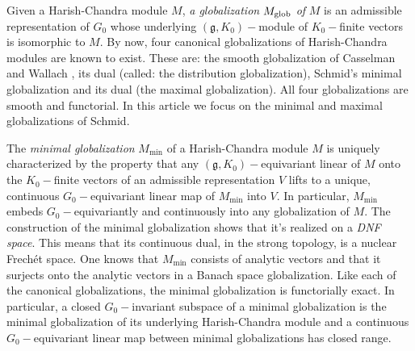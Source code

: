 \smallskip \smallskip

\noindent Given a Harish-Chandra module $M$, \emph{a globalization} $M_{%
\text{glob}}$ \emph{of }$M$ is an admissible representation of $G_{0}$ whose
underlying $(\mathfrak{g},K_{0})-$module of $K_{0}-$finite vectors is
isomorphic to $M$. By now, four canonical globalizations of Harish-Chandra
modules are known to exist. These are: the smooth globalization of Casselman
and Wallach \cite{C}, its dual (called: the distribution globalization),
Schmid's minimal globalization \cite{S} and its dual (the maximal
globalization). All four globalizations are smooth and functorial. In this
article we focus on the minimal and maximal globalizations of Schmid.

\smallskip \smallskip

\noindent The \emph{minimal globalization }$M_{\text{min}}$ of a
Harish-Chandra module $M$ is uniquely characterized by the property that any
$(\mathfrak{g},K_{0})-$equivariant linear of $M$ onto the $K_{0}-$finite
vectors of an admissible representation $V$ lifts to a unique, continuous $%
G_{0}-$equivariant linear map of $M_{\text{min}}$ into $V$. In particular, $%
M_{\text{min}}$ embeds $G_{0}-$equivariantly and continuously into any
globalization of $M$. The construction of the minimal globalization shows
that it's realized on a \emph{DNF space}. This means that its continuous
dual, in the strong topology, is a nuclear Frech\'{e}t space. One knows that
$M_{\text{min}}$ consists of analytic vectors and that it surjects onto the
analytic vectors in a Banach space globalization. Like each of the canonical
globalizations, the minimal globalization is functorially exact. In
particular, a closed $G_{0}-$invariant subspace of a minimal globalization
is the minimal globalization of its underlying Harish-Chandra module and a
continuous $G_{0}-$equivariant linear map between minimal globalizations has
closed range.

\smallskip


